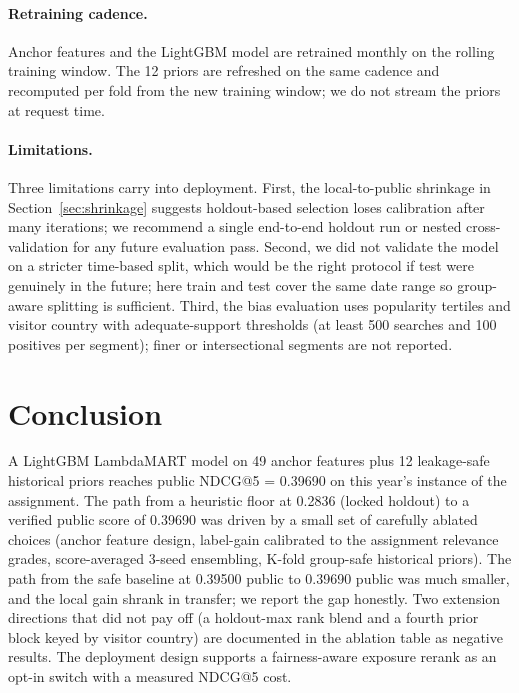 \documentclass[runningheads]{llncs}
\begin{document}
\paragraph{Retraining cadence.}
Anchor features and the LightGBM model are retrained monthly on
the rolling training window. The 12 priors are refreshed on the
same cadence and recomputed per fold from the new training
window; we do not stream the priors at request time.

\paragraph{Limitations.}
Three limitations carry into deployment. First, the local-to-public
shrinkage in Section~\ref{sec:shrinkage} suggests holdout-based selection
loses calibration after many iterations; we recommend a single end-to-end
holdout run or nested cross-validation for any future evaluation pass.
Second, we did not validate the model on a stricter time-based
split, which would be the right protocol if test were genuinely in
the future; here train and test cover the same date range so
group-aware splitting is sufficient. Third, the bias evaluation
uses popularity tertiles and visitor country with adequate-support
thresholds (at least 500 searches and 100 positives per segment);
finer or intersectional segments are not reported.

\section{Conclusion}
\label{sec:conclusion}

A LightGBM LambdaMART model on 49 anchor features plus 12
leakage-safe historical priors reaches public NDCG@5 = 0.39690 on
this year's instance of the assignment. The path from a heuristic
floor at 0.2836 (locked holdout) to a verified public score of
0.39690 was driven by a small set of carefully ablated choices
(anchor feature design, label-gain calibrated to the assignment
relevance grades, score-averaged 3-seed ensembling, K-fold
group-safe historical priors). The path from the safe baseline at
0.39500 public to 0.39690 public was much smaller, and the local
gain shrank in transfer; we report the gap honestly. Two
extension directions that did not pay off (a holdout-max rank
blend and a fourth prior block keyed by visitor country) are
documented in the ablation table as negative results. The
deployment design supports a fairness-aware exposure rerank as an
opt-in switch with a measured NDCG@5 cost.



\end{document}
